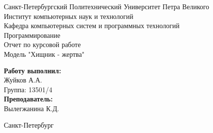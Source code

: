 \documentclass[a4paper]{article}
\begin{document}


\begin{titlepage}	%

	\begin{center}		%

		\large Санкт-Петербургский Политехнический Университет Петра Великого\\
		\large Институт компьютерных наук и технологий \\
		\large Кафедра компьютерных систем и программных технологий\\[6cm]
		
		\huge Программирование\\[0.5cm] %
		\large Отчет по курсовой работе\\[0.1cm]
		\large Модель "Хищник - жертва"\\[5cm]

	\end{center}


	\begin{flushright} %
		\begin{minipage}{0.25\textwidth} %
			\begin{flushleft} %

				\large\textbf{Работу выполнил:}\\
				\large Жуйков А.А.\\
				\large {Группа:} 13501/4\\
				
				\large \textbf{Преподаватель:}\\
				\large Вылегжанина К.Д.
				

			\end{flushleft}
		\end{minipage}
	\end{flushright}
	
	\vfill %

	\begin{center}
	\large Санкт-Петербург\\
	\large \the\year %
	\end{center} %

\thispagestyle{empty} %
\end{titlepage} %
\end{document}
